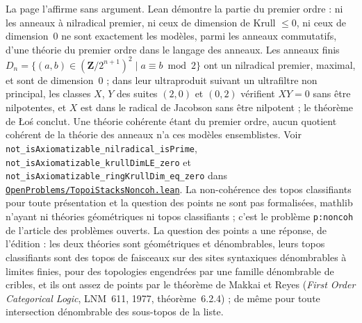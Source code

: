 {\small La page l'affirme sans argument. Lean démontre la partie du premier ordre : ni les anneaux à nilradical premier, ni ceux de dimension de Krull $\leq 0$, ni ceux de dimension~$0$ ne sont exactement les modèles, parmi les anneaux commutatifs, d'une théorie du premier ordre dans le langage des anneaux. Les anneaux finis $D_n = \{(a, b) \in (\mathbf Z/2^{n+1})^2 \mid a \equiv b \bmod 2\}$ ont un nilradical premier, maximal, et sont de dimension~$0$ ; dans leur ultraproduit suivant un ultrafiltre non principal, les classes $X$, $Y$ des suites $(2, 0)$ et $(0, 2)$ vérifient $XY = 0$ sans être nilpotentes, et $X$ est dans le radical de Jacobson sans être nilpotent ; le théorème de Łoś conclut. Une théorie cohérente étant du premier ordre, aucun quotient cohérent de la théorie des anneaux n'a ces modèles ensemblistes. Voir \texttt{not\_isAxiomatizable\_nilradical\_isPrime}, \texttt{not\_isAxiomatizable\_krullDimLE\_zero} et \texttt{not\_isAxiomatizable\_ringKrullDim\_eq\_zero} dans \href{https://github.com/Commutator-IO/GrothendieckArchivesProofs/blob/main/OpenProblems/TopoiStacksNoncoh.lean}{\texttt{OpenProblems/TopoiStacksNoncoh.\allowbreak{}lean}}. La non-cohérence des topos classifiants pour toute présentation et la question des points ne sont pas formalisées, mathlib n'ayant ni théories géométriques ni topos classifiants ; c'est le problème \texttt{p:noncoh} de l'article des problèmes ouverts. La question des points a une réponse, de l'édition : les deux théories sont géométriques et dénombrables, leurs topos classifiants sont des topos de faisceaux sur des sites syntaxiques dénombrables à limites finies, pour des topologies engendrées par une famille dénombrable de cribles, et ils ont assez de points par le théorème de Makkai et Reyes (\emph{First Order Categorical Logic}, LNM~611, 1977, théorème~6.2.4) ; de même pour toute intersection dénombrable des sous-topos de la liste.\par}

